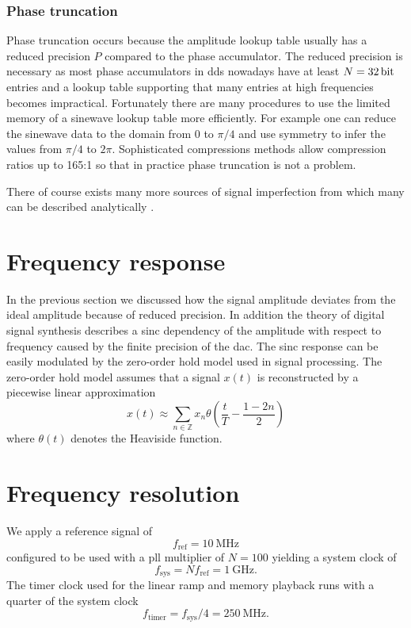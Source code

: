 \subsubsection{Phase truncation}

Phase truncation occurs because the amplitude lookup table usually has a
reduced precision $P$ compared to the phase accumulator. The reduced precision
is necessary as most phase accumulators in \gls{dds} nowadays have at least 
$N=\SI{32}{\bit}$ entries and a lookup table supporting that many entries at
high frequencies becomes impractical\cite{Cordesses2004}. Fortunately there
are many procedures to use the limited memory of a sinewave lookup table
more efficiently. For example one can reduce the sinewave data to the domain
from $0$ to $\pi/4$ and use symmetry to infer the values from $\pi/4$ to
$2\pi$. Sophisticated compressions methods allow compression ratios up to
165:1\cite{Cordesses2004} so that in practice phase truncation is not a
problem.

There of course exists many more sources of signal imperfection from which
many can be described analytically \cite{Goldberg1994}. 

\section{Frequency response}

In the previous section we discussed how the signal amplitude deviates from
the ideal amplitude because of reduced precision. In addition the theory of
digital signal synthesis describes a sinc dependency of the amplitude with
respect to frequency caused by the finite precision of the \gls{dac}. The
sinc response can be easily modulated by the zero-order hold model used
in signal processing. The zero-order hold model assumes that a signal $x(t)$
is reconstructed by a piecewise linear approximation
\begin{equation}
  x(t)
  \approx
  \sum_{n\in\mathbb{Z}}x_n\theta\left(\frac{t}{T}-\frac{1-2n}{2}\right)

\end{equation}
where $\theta(t)$ denotes the Heaviside function.

\section{Frequency resolution}

We apply a reference signal of
\begin{equation}
  f_\text{ref}=\SI{10}{\mega\hertz}
\end{equation}
configured to be used with a \gls{pll} multiplier of
$N=100$ yielding a system clock of
\begin{equation}
  f_\text{sys}=Nf_\text{ref}=\SI{1}{\giga\hertz}.
\end{equation}
The timer clock used for the linear ramp and memory playback runs with
a quarter of the system clock
\begin{equation}
  f_\text{timer}=f_\text{sys}/4=\SI{250}{\mega\hertz}.
\end{equation}

